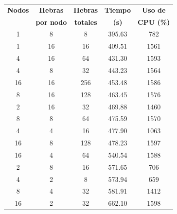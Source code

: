 \begin{table}[ht]
    \centering
    \small
    \setlength{\tabcolsep}{4pt}
    \renewcommand{\arraystretch}{1.1}
    \begin{tabular}{|c|c|c|c|c|}
        \hline
        \textbf{Nodos} & \textbf{Hebras}   & \textbf{Hebras}  & \textbf{Tiempo} & \textbf{Uso de}   \\
                       & \textbf{por nodo} & \textbf{totales} & \textbf{(s)}    & \textbf{CPU (\%)} \\
        \hline
        1              & 8                 & 8                & 395.63          & 782               \\
        1              & 16                & 16               & 409.51          & 1561              \\
        4              & 16                & 64               & 431.30          & 1593              \\
        4              & 8                 & 32               & 443.23          & 1564              \\
        16             & 16                & 256              & 453.48          & 1586              \\
        8              & 16                & 128              & 463.45          & 1576              \\
        2              & 16                & 32               & 469.88          & 1460              \\
        8              & 8                 & 64               & 475.59          & 1570              \\
        4              & 4                 & 16               & 477.90          & 1063              \\
        16             & 8                 & 128              & 478.23          & 1597              \\
        16             & 4                 & 64               & 540.54          & 1588              \\
        2              & 8                 & 16               & 571.65          & 706               \\
        4              & 2                 & 8                & 573.94          & 659               \\
        8              & 4                 & 32               & 581.91          & 1412              \\
        16             & 2                 & 32               & 662.10          & 1598              \\

\end{tabular}
\end{table}
